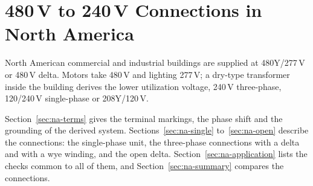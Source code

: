 \section{480\,V to 240\,V Connections in North America}
\label{sec:na}

North American commercial and industrial buildings are supplied at
480Y/277\,V or 480\,V delta. Motors take 480\,V and lighting 277\,V; a
dry-type transformer inside the building derives the lower utilization
voltage, 240\,V three-phase, 120/240\,V single-phase or 208Y/120\,V.

Section~\ref{sec:na-terms} gives the terminal markings, the phase shift and
the grounding of the derived system. Sections~\ref{sec:na-single}
to~\ref{sec:na-open} describe the connections: the single-phase unit, the
three-phase connections with a delta and with a wye winding, and the open
delta. Section~\ref{sec:na-application} lists the checks common to all of
them, and Section~\ref{sec:na-summary} compares the connections.








